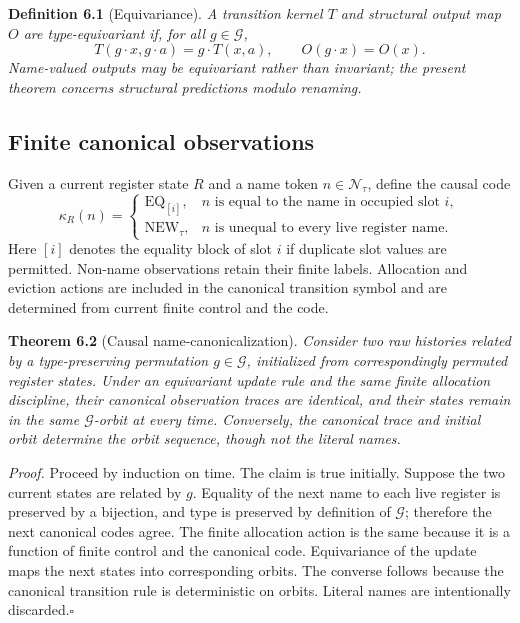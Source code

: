 \documentclass[11pt]{article}
\begin{document}
\textbf{Definition 6.1} (Equivariance). \emph{A transition kernel \(T\) and structural output map \(O\) are type-equivariant if, for all \(g\in\mathcal{G}\), \[T(g\cdot x,g\cdot a)=g\cdot T(x,a),
\qquad
O(g\cdot x)=O(x).\] Name-valued outputs may be equivariant rather than invariant; the present theorem concerns structural predictions modulo renaming.}

\subsection{Finite canonical observations}\label{finite-canonical-observations}

Given a current register state \(R\) and a name token \(n\in\mathcal N_\tau\), define the causal code \[\kappa_R(n)=
\begin{cases}
\mathrm{EQ}_{[i]}, & n\text{ is equal to the name in occupied slot }i,\\
\mathrm{NEW}_\tau, & n\text{ is unequal to every live register name}.
\end{cases}\] Here \([i]\) denotes the equality block of slot \(i\) if duplicate slot values are permitted. Non-name observations retain their finite labels. Allocation and eviction actions are included in the canonical transition symbol and are determined from current finite control and the code.

\label{thm:canonicalization}
\textbf{Theorem 6.2} (Causal name-canonicalization). \emph{Consider two raw histories related by a type-preserving permutation \(g\in\mathcal{G}\), initialized from correspondingly permuted register states. Under an equivariant update rule and the same finite allocation discipline, their canonical observation traces are identical, and their states remain in the same \(\mathcal{G}\)-orbit at every time. Conversely, the canonical trace and initial orbit determine the orbit sequence, though not the literal names.}

\emph{Proof.} Proceed by induction on time. The claim is true initially. Suppose the two current states are related by \(g\). Equality of the next name to each live register is preserved by a bijection, and type is preserved by definition of \(\mathcal{G}\); therefore the next canonical codes agree. The finite allocation action is the same because it is a function of finite control and the canonical code. Equivariance of the update maps the next states into corresponding orbits. The converse follows because the canonical transition rule is deterministic on orbits. Literal names are intentionally discarded.\hfill\(\square\)
\end{document}
